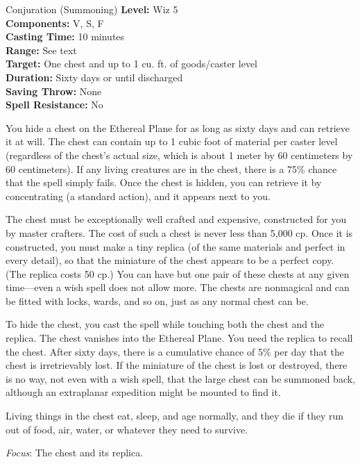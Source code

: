 {Conjuration (Summoning)}
{
	\textbf{Level:}
	Wiz 5\\
	\textbf{Components:}
	V, S, F\\
	\textbf{Casting Time:}
	10 minutes\\
	\textbf{Range:}
	See text\\
	\textbf{Target:}
	One chest and up to 1 cu. ft. of goods/caster level\\
	\textbf{Duration:}
	Sixty days or until discharged\\
	\textbf{Saving Throw:}
	None\\
	\textbf{Spell Resistance:}
	No\\
}
{
	You hide a chest on the Ethereal Plane for as long as sixty days and can retrieve it at will. The chest can contain up to 1 cubic foot of material per caster level (regardless of the chest's actual size, which is about 1 meter by 60 centimeters by 60 centimeters). If any living creatures are in the chest, there is a 75\% chance that the spell simply fails. Once the chest is hidden, you can retrieve it by concentrating (a standard action), and it appears next to you.

	The chest must be exceptionally well crafted and expensive, constructed for you by master crafters. The cost of such a chest is never less than 5,000 cp. Once it is constructed, you must make a tiny replica (of the same materials and perfect in every detail), so that the miniature of the chest appears to be a perfect copy. (The replica costs 50 cp.) You can have but one pair of these chests at any given time---even a wish spell does not allow more. The chests are nonmagical and can be fitted with locks, wards, and so on, just as any normal chest can be.

	To hide the chest, you cast the spell while touching both the chest and the replica. The chest vanishes into the Ethereal Plane. You need the replica to recall the chest. After sixty days, there is a cumulative chance of 5\% per day that the chest is irretrievably lost. If the miniature of the chest is lost or destroyed, there is no way, not even with a wish spell, that the large chest can be summoned back, although an extraplanar expedition might be mounted to find it.

	Living things in the chest eat, sleep, and age normally, and they die if they run out of food, air, water, or whatever they need to survive.

	\textit{Focus}:
	The chest and its replica.

}
